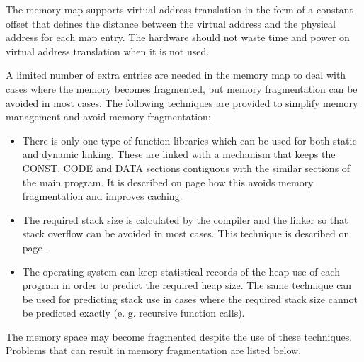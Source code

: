 \documentclass[forwardcom.tex]{subfiles}
\begin{document}
The memory map supports virtual address translation in the form of a constant offset that defines the distance between the virtual address and the physical address for each map entry. The hardware should not waste time and power on virtual address translation when it is not used.
\vv

A limited number of extra entries are needed in the memory map to deal with cases where the memory becomes fragmented, but memory fragmentation can be avoided in most cases. The following techniques are provided to simplify memory management and avoid memory fragmentation:

\begin{itemize}
\item There is only one type of function libraries which can be used for both static and dynamic linking. These are linked with a mechanism that keeps the CONST, CODE and DATA sections contiguous with the similar sections of the main program. It is described on page \pageref{libraryLinkMethods} how this avoids memory fragmentation and improves caching.

\item The required stack size is calculated by the compiler and the linker so that stack overflow can be avoided in most cases. This technique is described on page \pageref{predictingStackSize}.

\item The operating system can keep statistical records of the heap use of each program in order to predict the required heap size. The same technique can be used for predicting stack use in cases where the required stack size cannot be predicted exactly (e. g. recursive function calls). 
\end{itemize}

The memory space may become fragmented despite the use of these techniques. Problems that can result in memory fragmentation are listed below. 
\end{document}
